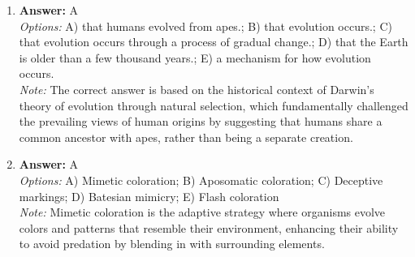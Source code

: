 \documentclass[12pt]{article}
\begin{document}
\begin{enumerate}[label=\arabic*.]
\item \textbf{Answer:} A
\\ \textit{Options:} A) that humans evolved from apes.; B) that evolution occurs.; C) that evolution occurs through a process of gradual change.; D) that the Earth is older than a few thousand years.; E) a mechanism for how evolution occurs.
\\ \textit{Note:} The correct answer is based on the historical context of Darwin's theory of evolution through natural selection, which fundamentally challenged the prevailing views of human origins by suggesting that humans share a common ancestor with apes, rather than being a separate creation.
\item \textbf{Answer:} A
\\ \textit{Options:} A) Mimetic coloration; B) Aposomatic coloration; C) Deceptive markings; D) Batesian mimicry; E) Flash coloration
\\ \textit{Note:} Mimetic coloration is the adaptive strategy where organisms evolve colors and patterns that resemble their environment, enhancing their ability to avoid predation by blending in with surrounding elements.
\end{enumerate}
\end{document}
